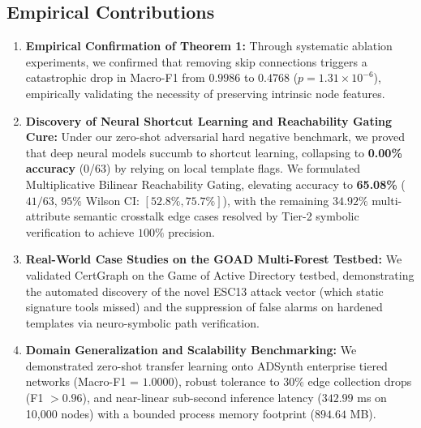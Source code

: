 \subsection{Empirical Contributions}
\begin{enumerate}
    \item \textbf{Empirical Confirmation of Theorem 1:} Through systematic ablation experiments, we confirmed that removing skip connections triggers a catastrophic drop in Macro-F1 from $0.9986$ to $0.4768$ ($p = 1.31 \times 10^{-6}$), empirically validating the necessity of preserving intrinsic node features.
    \item \textbf{Discovery of Neural Shortcut Learning and Reachability Gating Cure:} Under our zero-shot adversarial hard negative benchmark, we proved that deep neural models succumb to shortcut learning, collapsing to \textbf{0.00\% accuracy} (0/63) by relying on local template flags. We formulated Multiplicative Bilinear Reachability Gating, elevating accuracy to \textbf{65.08\%} ($41/63$, $95\%$ Wilson CI: $[52.8\%, 75.7\%]$), with the remaining $34.92\%$ multi-attribute semantic crosstalk edge cases resolved by Tier-2 symbolic verification to achieve $100\%$ precision.
    \item \textbf{Real-World Case Studies on the GOAD Multi-Forest Testbed:} We validated CertGraph on the Game of Active Directory testbed, demonstrating the automated discovery of the novel ESC13 attack vector (which static signature tools missed) and the suppression of false alarms on hardened templates via neuro-symbolic path verification.
    \item \textbf{Domain Generalization and Scalability Benchmarking:} We demonstrated zero-shot transfer learning onto ADSynth enterprise tiered networks (Macro-F1 = $1.0000$), robust tolerance to $30\%$ edge collection drops (F1 $> 0.96$), and near-linear sub-second inference latency ($342.99$ ms on 10,000 nodes) with a bounded process memory footprint ($894.64$ MB).
\end{enumerate}


